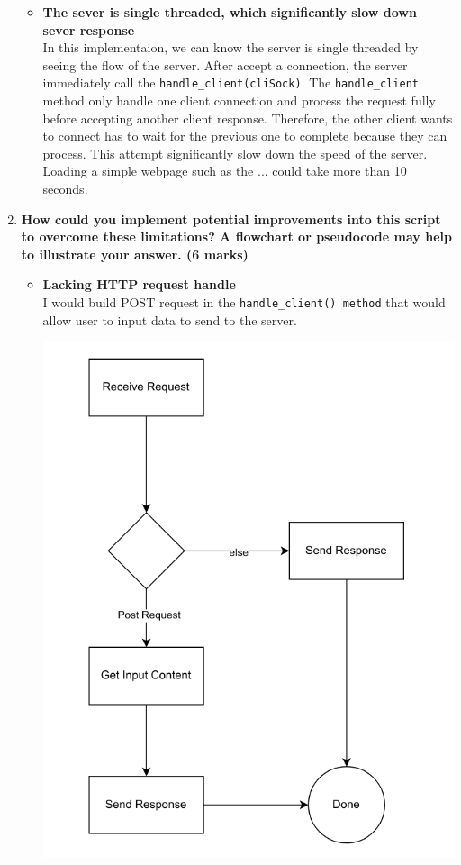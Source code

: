 \documentclass[11pt]{article}
\begin{document}
\begin{enumerate}
\begin{itemize}
				\item \textbf{The sever is single threaded, which significantly slow down sever response} \\
				In this implementaion, we can know the server is single threaded by seeing the flow of the server. After accept a connection, the server immediately call the \texttt{handle\_client(cliSock)}. The \texttt{handle\_client} method only handle one client connection and process the request fully before accepting another client response. Therefore, the other client wants to connect has to wait for the previous one to complete because they can process. This attempt significantly slow down the speed of the server. Loading a simple webpage such as the ... could take more than 10 seconds.\\
			\end{itemize}
		
		\item \textbf{How could you implement potential improvements into this script to overcome these limitations? A flowchart or pseudocode may help to illustrate your answer. (6 marks)}\\
			\begin{itemize}
				\item \textbf{Lacking HTTP request handle} \\
					I would build POST request in the \texttt{handle\_client() method} that would allow user to input data to send to the server.\\
					\begin{center}
						\includegraphics[scale=0.4]{post.png}
					\end{center}
				\pagebreak
				  

\end{itemize}
\end{enumerate}
\end{document}
